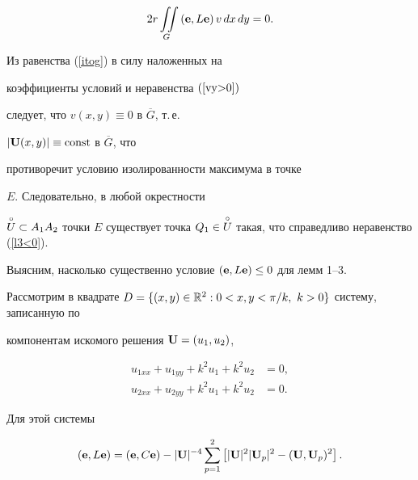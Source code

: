 \begin{pf}
\begin{multline}
2r\iint\limits_{G}{({\bold e},L{\bold e})\,v\,}dx\,dy=0.


\end{multline}


Из равенства (\ref{itog}) в силу наложенных на


коэффициенты условий и неравенства $(\ref{vy>0})$


следует, что $v(x,y)\equiv 0$ в $\overline{G}$, т.\,е.


$|{\bold U}(x,y)| \equiv \operatorname{const}$ в $\overline{G}$, что


противоречит условию изолированности максимума в точке


$E$. Следовательно, в любой окрестности


$\up{\circ}{U} \subset A_1A_2$ точки $E$ существует точка $Q_1 \in


\up{\circ}{U}$ такая, что справедливо неравенство (\ref{l3<0}).


\end{pf}





Выясним, насколько существенно условие $({\bold e},L{\bold


e})\le 0$ для лемм 1--3.


Рассмотрим в квадрате $D=\{(x,y)\in {\Bbb


R}^2:0<x,y<\pi /k,\ k>0\}$ систему, записанную по


компонентам искомого решения ${\bold U}=(u_1,u_2)$,


\begin{equation}\label{ele<0}


\begin{split}


u_{1xx}+u_{1yy}+k^2u_1+k^2u_2&=0,\\


u_{2xx}+u_{2yy}+k^2u_1+k^2u_2&=0.


\end{split}


\end{equation}


Для этой системы


\begin{equation}\label{sootn}


({\bold e},L{\bold e})=({\bold e},C{\bold e})-|{\bold


U}|^{-4}\sum_{p=1}^2\left [|{\bold U}|^2|{\bold


U}_p|^2-({\bold U},{\bold U}_p)^2\right].


\end{equation}


